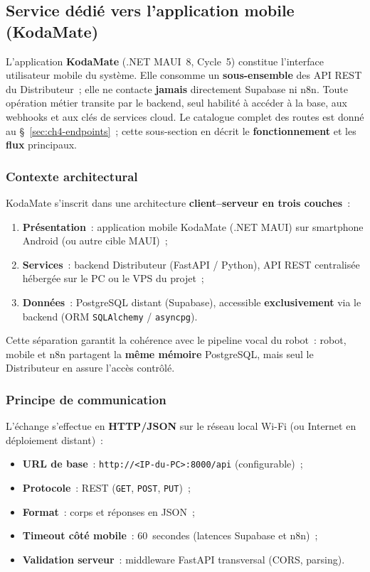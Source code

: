 \documentclass[a4paper,12pt]{report}
\begin{document}
	\subsection{Service dédié vers l'application mobile (KodaMate)}
	\label{sec:ch4-mobile-interaction}
	
	L'application \textbf{KodaMate} (.NET MAUI~8, Cycle~5) constitue l'interface
	utilisateur mobile du système. Elle consomme un \textbf{sous-ensemble} des API REST
	du Distributeur~; elle ne contacte \textbf{jamais} directement Supabase ni n8n.
	Toute opération métier transite par le backend, seul habilité à accéder à la base,
	aux webhooks et aux clés de services cloud. Le catalogue complet des routes est
	donné au §~\ref{sec:ch4-endpoints}~; cette sous-section en décrit le
	\textbf{fonctionnement} et les \textbf{flux} principaux.
	
	\subsubsection{Contexte architectural}
	
	KodaMate s'inscrit dans une architecture \textbf{client--serveur en trois couches}~:
	\begin{enumerate}[leftmargin=*, itemsep=0.25em]
		\item \textbf{Présentation}~: application mobile KodaMate (.NET MAUI) sur
		smartphone Android (ou autre cible MAUI)~;
		\item \textbf{Services}~: backend Distributeur (FastAPI / Python), API REST
		centralisée hébergée sur le PC ou le VPS du projet~;
		\item \textbf{Données}~: PostgreSQL distant (Supabase), accessible
		\textbf{exclusivement} via le backend (ORM \texttt{SQLAlchemy} / \texttt{asyncpg}).
	\end{enumerate}
	
	Cette séparation garantit la cohérence avec le pipeline vocal du robot~: robot,
	mobile et n8n partagent la \textbf{même mémoire} PostgreSQL, mais seul le
	Distributeur en assure l'accès contrôlé.
	
	\subsubsection{Principe de communication}
	
	L'échange s'effectue en \textbf{HTTP/JSON} sur le réseau local Wi-Fi (ou Internet
	en déploiement distant)~:
	\begin{itemize}[noitemsep]
		\item \textbf{URL de base}~: \texttt{http://<IP-du-PC>:8000/api} (configurable)~;
		\item \textbf{Protocole}~: REST (\texttt{GET}, \texttt{POST}, \texttt{PUT})~;
		\item \textbf{Format}~: corps et réponses en JSON~;
		\item \textbf{Timeout côté mobile}~: 60~secondes (latences Supabase et n8n)~;
		\item \textbf{Validation serveur}~: middleware FastAPI transversal (CORS, parsing).
	\end{itemize}
	
\end{document}
